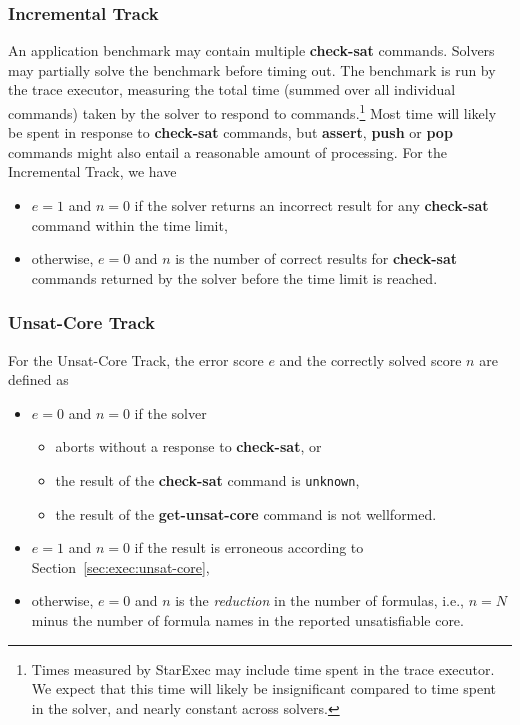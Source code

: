 \documentclass[12pt]{article}
\newcommand{\akey}[1]{\textbf{#1}\xspace}
\newcommand{\inctrack}{Incremental Track\xspace}
\newcommand{\ucoretrack}{Unsat-Core Track\xspace}
\begin{document}
\subsubsection{\inctrack}
%
An application benchmark may contain multiple \akey{check-sat}
commands.  Solvers may partially solve the benchmark before timing
out.  The benchmark is run by the trace executor, measuring the total
time (summed over all individual commands) taken by the solver to
respond to commands.\footnote{Times measured by StarExec may include
  time spent in the trace executor.  We expect that this time will
  likely be insignificant compared to time spent in the solver, and
  nearly constant across solvers.}  Most time will likely be spent in
response to \akey{check-sat} commands, but \akey{assert}, \akey{push}
or \akey{pop} commands might also entail a reasonable amount of
processing.  For the \inctrack, we have
\begin{itemize}
\item $e=1$ and $n=0$ if the solver returns an incorrect result for any
  \akey{check-sat} command within the time limit,
\item otherwise, $e=0$ and $n$ is the number of correct results for
  \akey{check-sat} commands returned by the solver before the time
  limit is reached.
\end{itemize}

\subsubsection{\ucoretrack}
  For the \ucoretrack, the error score $e$ and the correctly solved score $n$
  are defined as
  \begin{itemize}
  \item $e=0$ and $n=0$ if the solver
    \begin{itemize}[noitemsep,nolistsep]
      \item aborts without a response to \akey{check-sat}, or
      \item the result of the \akey{check-sat} command is \texttt{unknown},
      \item the result of the \akey{get-unsat-core} command is not wellformed.
    \end{itemize}
  \item $e=1$ and  $n=0$ if the result is erroneous according to
    Section~\ref{sec:exec:unsat-core},
  \item otherwise, $e=0$ and $n$ is the \emph{reduction} in the number of
    formulas, i.e., $n = N$ minus the number of formula names in the
    reported unsatisfiable core.
  \end{itemize}
\end{document}
